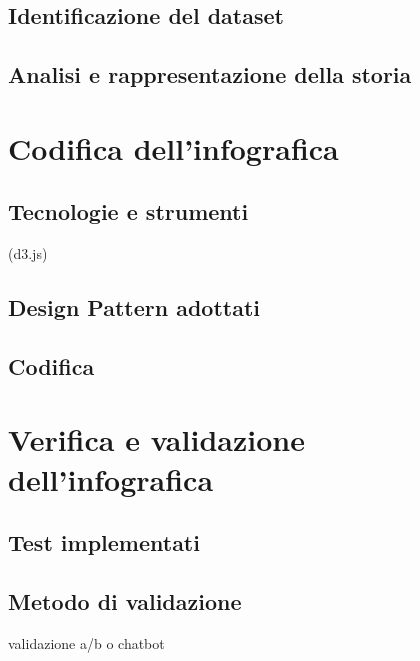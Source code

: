 \subsection{Identificazione del dataset}

\subsection{Analisi e rappresentazione della storia}



\section{Codifica dell'infografica}
\subsection{Tecnologie e strumenti}\label{subsec:tecnologie}
(d3.js)
\subsection{Design Pattern adottati}
\subsection{Codifica}



\section{Verifica e validazione dell'infografica}
\subsection{Test implementati}
\subsection{Metodo di validazione}
validazione a/b o chatbot

